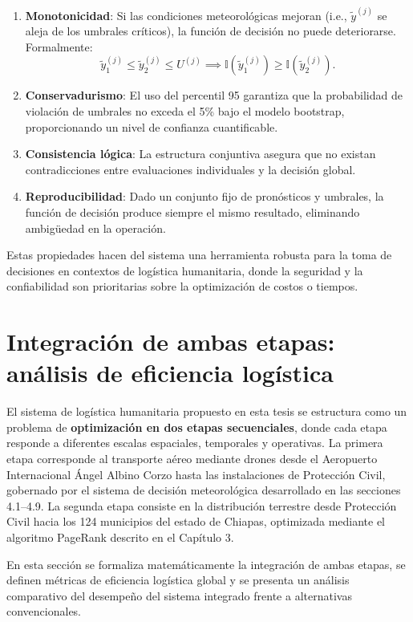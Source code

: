 \documentclass[
  spanish,
  us-letterpaper,
]{scrreprt}
\numberwithin{equation}{section}
\begin{document}
\begin{enumerate}
\def\labelenumi{\arabic{enumi}.}
\item
  \textbf{Monotonicidad}: Si las condiciones meteorológicas mejoran
  (i.e., \(\tilde{y}^{(j)}\) se aleja de los umbrales críticos), la
  función de decisión no puede deteriorarse. Formalmente: \[
  \tilde{y}^{(j)}_1 \leq \tilde{y}^{(j)}_2 \leq U^{(j)} \implies \mathbb{I}(\tilde{y}^{(j)}_1) \geq \mathbb{I}(\tilde{y}^{(j)}_2).
  \]
\item
  \textbf{Conservadurismo}: El uso del percentil 95 garantiza que la
  probabilidad de violación de umbrales no exceda el 5\% bajo el modelo
  bootstrap, proporcionando un nivel de confianza cuantificable.
\item
  \textbf{Consistencia lógica}: La estructura conjuntiva asegura que no
  existan contradicciones entre evaluaciones individuales y la decisión
  global.
\item
  \textbf{Reproducibilidad}: Dado un conjunto fijo de pronósticos y
  umbrales, la función de decisión produce siempre el mismo resultado,
  eliminando ambigüedad en la operación.
\end{enumerate}

Estas propiedades hacen del sistema una herramienta robusta para la toma
de decisiones en contextos de logística humanitaria, donde la seguridad
y la confiabilidad son prioritarias sobre la optimización de costos o
tiempos.

\section{Integración de ambas etapas: análisis de eficiencia
logística}\label{integraciuxf3n-de-ambas-etapas-anuxe1lisis-de-eficiencia-loguxedstica}

El sistema de logística humanitaria propuesto en esta tesis se
estructura como un problema de \textbf{optimización en dos etapas
secuenciales}, donde cada etapa responde a diferentes escalas
espaciales, temporales y operativas. La primera etapa corresponde al
transporte aéreo mediante drones desde el Aeropuerto Internacional Ángel
Albino Corzo hasta las instalaciones de Protección Civil, gobernado por
el sistema de decisión meteorológica desarrollado en las secciones
4.1--4.9. La segunda etapa consiste en la distribución terrestre desde
Protección Civil hacia los 124 municipios del estado de Chiapas,
optimizada mediante el algoritmo PageRank descrito en el Capítulo 3.

En esta sección se formaliza matemáticamente la integración de ambas
etapas, se definen métricas de eficiencia logística global y se presenta
un análisis comparativo del desempeño del sistema integrado frente a
alternativas convencionales.
\end{document}
